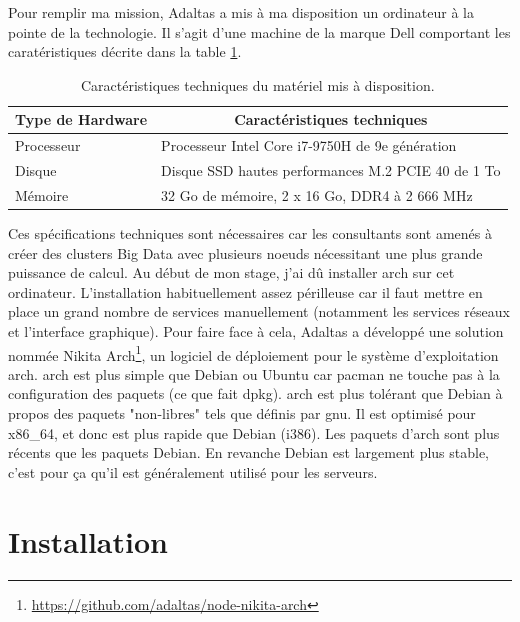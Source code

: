 \documentclass[12pt, french]{report}
\begin{document}
Pour remplir ma mission, Adaltas a mis à ma disposition un ordinateur à la pointe de la technologie. Il s'agit d'une machine de la marque Dell comportant les caratéristiques décrite dans la table \ref{tab:caractéristiques}.

\begin{table}[h]
\centering
\begin{tabular}{|l|l|}
\hline
\multicolumn{1}{|c|}{\textbf{Type de Hardware}} & \multicolumn{1}{c|}{\textbf{Caractéristiques techniques}}                          \\ \hline
Processeur                                      & Processeur Intel Core i7-9750H de 9e génération                                    \\ \hline
Disque                                          & Disque SSD hautes performances M.2 PCIE 40 de 1 To                                 \\ \hline
Mémoire                                         & 32 Go de mémoire, 2 x 16 Go, DDR4 à 2 666 MHz                                      \\ \hline
\end{tabular}
\caption{Caractéristiques techniques du matériel mis à disposition.}
\label{tab:caractéristiques}
\end{table}

Ces spécifications techniques sont nécessaires car les consultants sont amenés à créer des clusters Big Data avec plusieurs noeuds nécessitant une plus grande puissance de calcul. Au début de mon stage, j’ai dû installer \gls{arch} sur cet ordinateur. L’installation  habituellement assez périlleuse car il faut mettre en place un grand nombre de services manuellement (notamment les services réseaux et l’interface graphique). Pour faire face à cela, Adaltas a développé une solution nommée Nikita Arch\footnote{\href{https://github.com/adaltas/node-nikita-arch}{https://github.com/adaltas/node-nikita-arch}}, un logiciel de déploiement pour le système d'exploitation \gls{arch}. \gls{arch} est plus simple que Debian ou Ubuntu car \gls{pacman} ne touche pas à la configuration des paquets (ce que fait \gls{dpkg}). \gls{arch} est plus tolérant que Debian à propos des paquets "non-libres" tels que définis par \gls{gnu}. Il est optimisé pour x86\_64, et donc est plus rapide que Debian (i386). Les paquets d'\gls{arch} sont plus récents que les paquets Debian. En revanche Debian est largement plus stable, c'est pour ça qu'il est généralement utilisé pour les serveurs.

\chapter{Installation}
\end{document}
